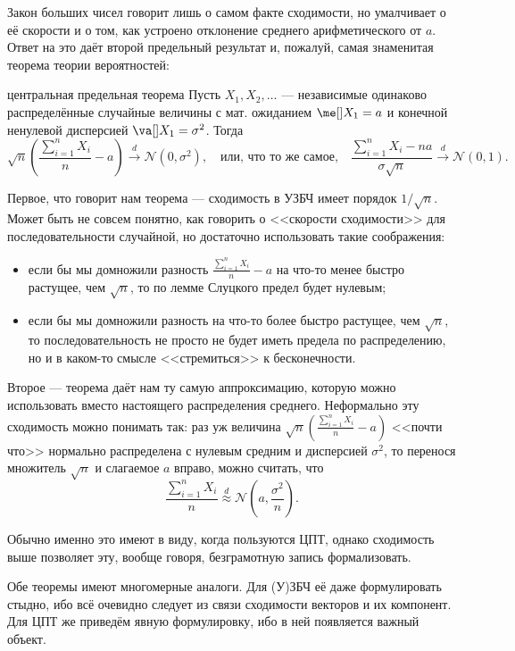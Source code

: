 Закон больших чисел говорит лишь о самом факте сходимости, но умалчивает о её скорости и о том, как устроено отклонение среднего арифметического от $a$. Ответ на это даёт второй предельный результат и, пожалуй, самая знаменитая теорема теории вероятностей:

\begin{theorem}{центральная предельная теорема}{}
    Пусть $X_1, X_2, \ldots$ --- независимые одинаково распределённые случайные величины с мат. ожиданием $\me[] X_1 = a$ и конечной ненулевой дисперсией $\va[] X_1 = \sigma^2$. Тогда
    \[
    \sqrt{n}\left(\frac{\sum_{i=1}^n X_i}{n} - a\right) \stackrel{d}{\to} \mathcal{N}(0, \sigma^2), \quad \text{или, что то же самое,}\quad \frac{\sum_{i=1}^n X_i - na}{\sigma\sqrt{n}} \stackrel{d}{\to} \mathcal{N}(0, 1).
    \]
\end{theorem}

Первое, что говорит нам теорема --- сходимость в УЗБЧ имеет порядок $1 / \sqrt{n}$. Может быть не совсем понятно, как говорить о <<скорости сходимости>> для последовательности случайной, но достаточно использовать такие соображения:
\begin{itemize}
	\item если бы мы домножили разность $\frac{\sum_{i=1}^n X_i}{n} - a$ на что-то менее быстро растущее, чем $\sqrt{n}$, то по лемме Слуцкого предел будет нулевым;
	\item если бы мы домножили разность на что-то более быстро растущее, чем $\sqrt{n}$, то последовательность не просто не будет иметь предела по распределению, но и в каком-то смысле <<стремиться>> к бесконечности.
\end{itemize}

Второе --- теорема даёт нам ту самую аппроксимацию, которую можно использовать вместо настоящего распределения среднего. Неформально эту сходимость можно понимать так: раз уж величина $\sqrt{n}\left(\frac{\sum_{i=1}^n X_i}{n} - a\right)$ <<почти что>> нормально распределена с нулевым средним и дисперсией $\sigma^2$, то перенося множитель $\sqrt{n}$ и слагаемое $a$ вправо, можно считать, что
\[
\frac{\sum_{i=1}^n X_i}{n} \stackrel{d}{\approx} \mathcal{N}\left(a, \frac{\sigma^2}{n}\right).
\]

Обычно именно это имеют в виду, когда пользуются ЦПТ, однако сходимость выше позволяет эту, вообще говоря, безграмотную запись формализовать.


Обе теоремы имеют многомерные аналоги. Для (У)ЗБЧ её даже формулировать стыдно, ибо всё очевидно следует из связи сходимости векторов и их компонент. Для ЦПТ же приведём явную формулировку, ибо в ней появляется важный объект.

